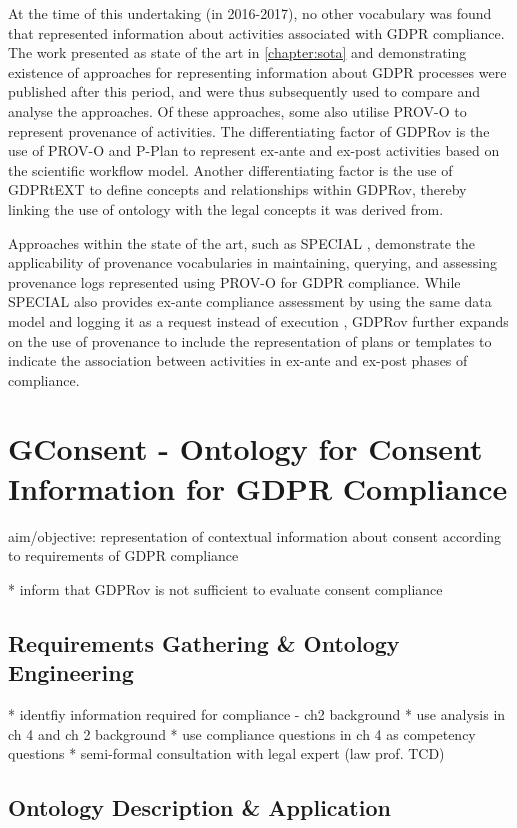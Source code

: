 At the time of this undertaking (in 2016-2017), no other vocabulary was found that represented information about activities associated with GDPR compliance.
The work presented as state of the art in \autoref{chapter:sota} and demonstrating existence of approaches for representing information about GDPR processes were published after this period, and were thus subsequently used to compare and analyse the approaches. Of these approaches, some also utilise PROV-O to represent provenance of activities. The differentiating factor of GDPRov is the use of PROV-O and P-Plan to represent ex-ante and ex-post activities based on the scientific workflow model. Another differentiating factor is the use of GDPRtEXT to define concepts and relationships within GDPRov, thereby linking the use of ontology with the legal concepts it was derived from.

Approaches within the state of the art, such as SPECIAL \cite{}, demonstrate the applicability of provenance vocabularies in maintaining, querying, and assessing provenance logs represented using PROV-O for GDPR compliance.
While SPECIAL also provides ex-ante compliance assessment by using the same data model and logging it as a request instead of execution \cite{}, GDPRov further expands on the use of provenance to include the representation of plans or templates to indicate the association between activities in ex-ante and ex-post phases of compliance.

\section{GConsent - Ontology for Consent Information for GDPR Compliance}\label{sec:voc:GConsent}

aim/objective: representation of contextual information about consent according to requirements of GDPR compliance

* inform that GDPRov is not sufficient to evaluate consent compliance

\subsection{Requirements Gathering \& Ontology Engineering}

* identfiy information required for compliance - ch2 background
* use analysis in ch 4 and ch 2 background
* use compliance questions in ch 4 as competency questions
* semi-formal consultation with legal expert (law prof. TCD)

\subsection{Ontology Description \& Application}

